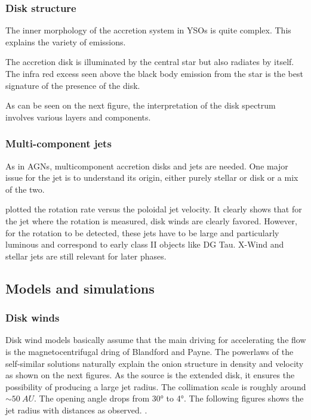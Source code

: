\documentclass[10pt,a4paper,english]{article}
\begin{document}
\subsubsection{Disk structure}

The inner morphology of the accretion system in YSOs is quite complex. This explains the variety of emissions.

The accretion disk is illuminated by the central star but also radiates by itself. The infra red excess seen above the black body emission from the star is the best signature of the presence of the disk.

As can be seen on the next figure, the interpretation of the disk spectrum involves various layers and components.

\subsubsection{Multi-component jets}
As in AGNs, multicomponent accretion disks and jets are needed. One major issue for the jet is to understand its origin, either purely stellar or disk or a mix of the two.

\cite{2006A&A...453..785F} plotted the rotation rate versus the poloidal jet velocity. It clearly shows that for the jet where the rotation is measured, disk winds are clearly favored. However, for the rotation to be detected, these jets have to be large and particularly luminous and correspond to early class II objects like DG Tau. X-Wind and stellar jets are still relevant for later phases.
\subsection{Models and simulations}

\subsubsection{Disk winds}
Disk wind models basically assume that the main driving for accelerating the flow is the magnetocentrifugal dring of Blandford and Payne. The powerlaws of the self-similar solutions naturally explain the onion structure in density and velocity as shown on the next figures.
As the source is the extended disk, it ensures the possibility of producing a large jet radius. The collimation scale is roughly around $\sim \SI{50}{AU}$. The opening angle drops from \ang{30} to \ang{4}. The following figures shows the jet radius with distances as observed. .
\end{document}
